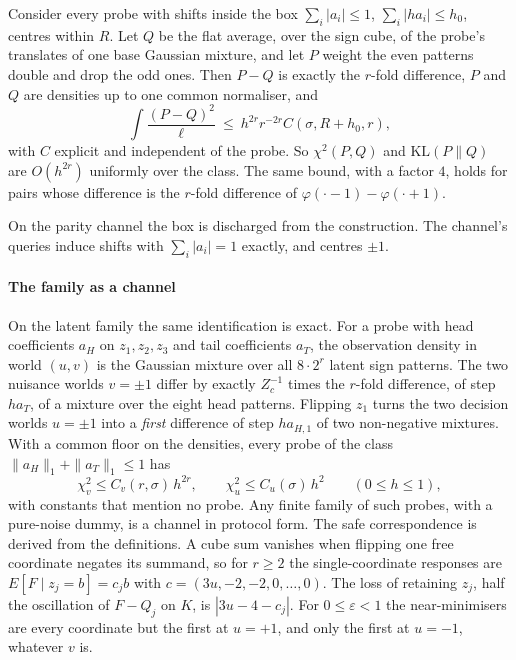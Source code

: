 \begin{theorem}
\label{thm:unif}
Consider every probe with shifts inside the box $\sum_{i}|a_{i}|\le1$, $\sum_{i}|ha_{i}|\le h_{0}$,
centres within $R$. Let $Q$ be the flat average, over the sign cube, of the probe's translates
of one base Gaussian mixture, and let $P$ weight the even patterns double and drop the odd
ones. Then $P-Q$ is exactly the $r$-fold difference, $P$ and $Q$ are densities up to one common
normaliser, and
\[
\int\frac{(P-Q)^{2}}{\ell}\ \le\ h^{2r}r^{-2r}C(\sigma,R+h_{0},r),
\]
with $C$ explicit and independent of the probe. So $\chi^{2}(P,Q)$ and $\mathrm{KL}(P\|Q)$ are
$O(h^{2r})$ uniformly over the class. The same bound, with a factor $4$, holds for pairs whose
difference is the $r$-fold difference of $\varphi(\cdot-1)-\varphi(\cdot+1)$.
\end{theorem}


On the parity channel the box is discharged from the construction. The channel's queries
induce shifts with $\sum_{i}|a_{i}|=1$ exactly, and centres $\pm1$.


\paragraph{The family as a channel} On the latent family the same identification is exact. For
a probe with head coefficients $a_{H}$ on $z_{1},z_{2},z_{3}$ and tail coefficients $a_{T}$, the
observation density in world $(u,v)$ is the Gaussian mixture over all $8\cdot2^{r}$ latent sign
patterns. The two nuisance worlds $v=\pm1$ differ by exactly
$Z_{c}^{-1}$ times the $r$-fold difference, of step $ha_{T}$, of a mixture over the eight head
patterns. Flipping $z_{1}$ turns the two decision worlds $u=\pm1$ into a \emph{first}
difference of step $h a_{H,1}$ of two non-negative mixtures. With a common floor on the
densities, every probe of the class $\|a_{H}\|_{1}+\|a_{T}\|_{1}\le1$ has
\[
\chi^{2}_{v}\le C_{v}(r,\sigma)\,h^{2r},\qquad \chi^{2}_{u}\le C_{u}(\sigma)\,h^{2}
\qquad(0\le h\le1),
\]
with constants that mention no probe. Any finite family of such probes, with a pure-noise dummy,
is a channel in protocol form. The safe correspondence is derived from the definitions. A cube
sum vanishes when flipping one free coordinate negates its summand, so for $r\ge2$ the
single-coordinate responses are $E[F\mid z_{j}=b]=c_{j}b$ with $c=(3u,-2,-2,0,\dots,0)$. The loss of
retaining $z_{j}$, half the oscillation of $F-Q_{j}$ on $K$, is $|3u-4-c_{j}|$. For
$0\le\varepsilon<1$ the near-minimisers are every coordinate but the first at $u=+1$, and only the
first at $u=-1$, whatever $v$ is.

